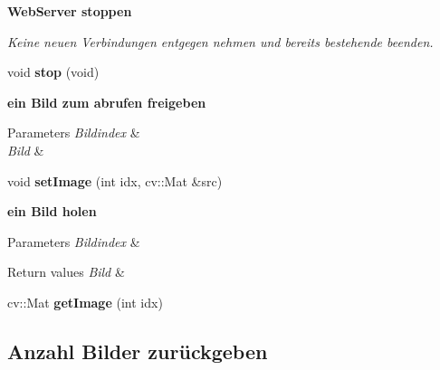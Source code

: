 \begin{Indent}{\bf Web\+Server stoppen}\par
{\em Keine neuen Verbindungen entgegen nehmen und bereits bestehende beenden. }\begin{DoxyCompactItemize}
\item 
\hypertarget{classrc_1_1WebServer_a06ae92d6dadbbfdc4289c31fbfab6624}{void {\bfseries stop} (void)}\label{classrc_1_1WebServer_a06ae92d6dadbbfdc4289c31fbfab6624}

\end{DoxyCompactItemize}
\end{Indent}
\begin{Indent}{\bf ein Bild zum abrufen freigeben}\par
{\em 
\begin{DoxyParams}{Parameters}
{\em Bildindex} & \\
\hline
{\em Bild} & \\
\hline
\end{DoxyParams}
}\begin{DoxyCompactItemize}
\item 
\hypertarget{classrc_1_1WebServer_af66eaf683e6e29c3f5c0530025aef5f7}{void {\bfseries set\+Image} (int idx, cv\+::\+Mat \&src)}\label{classrc_1_1WebServer_af66eaf683e6e29c3f5c0530025aef5f7}

\end{DoxyCompactItemize}
\end{Indent}
\begin{Indent}{\bf ein Bild holen}\par
{\em 
\begin{DoxyParams}{Parameters}
{\em Bildindex} & \\
\hline
\end{DoxyParams}

\begin{DoxyRetVals}{Return values}
{\em Bild} & \\
\hline
\end{DoxyRetVals}
}\begin{DoxyCompactItemize}
\item 
\hypertarget{classrc_1_1WebServer_afa3effc52a15f4bef40da8209502ac72}{cv\+::\+Mat {\bfseries get\+Image} (int idx)}\label{classrc_1_1WebServer_afa3effc52a15f4bef40da8209502ac72}

\end{DoxyCompactItemize}
\end{Indent}
\subsection*{Anzahl Bilder zurückgeben}
\label{_amgrpc3bffcdac63a754d2a2b6231dd296bb2}%

